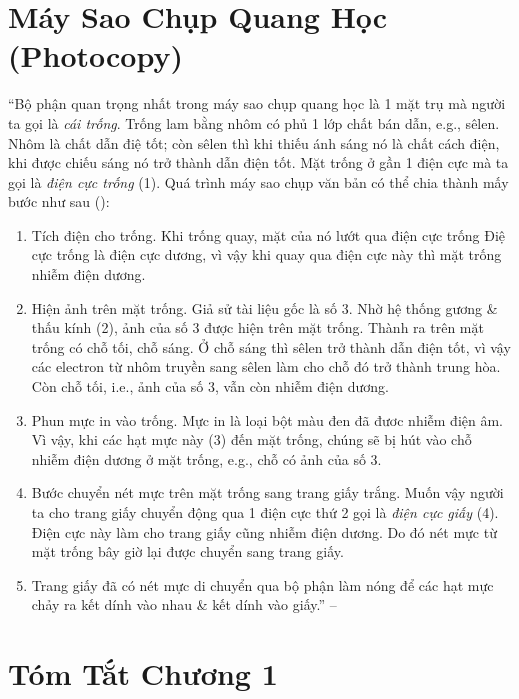 \documentclass[oneside]{book}
\numberwithin{equation}{section}
\begin{document}
\section{Máy Sao Chụp Quang Học (Photocopy)}
``Bộ phận quan trọng nhất trong máy sao chụp quang học là 1 mặt trụ mà người ta gọi là \textit{cái trống}. Trống lam bằng nhôm có phủ 1 lớp chất bán dẫn, e.g., sêlen. Nhôm là chất dẫn điệ tốt; còn sêlen thì khi thiếu ánh sáng nó là chất cách điện, khi được chiếu sáng nó trở thành dẫn điện tốt. Mặt trống ở gần 1 điện cực mà ta gọi là \textit{điện cực trống} (1). Quá trình máy sao chụp văn bản có thể chia thành mấy bước như sau (\cite[Hình 9.1, p. 44]{SGK_Vat_Ly_11_nang_cao}):
\begin{enumerate}
	\item Tích điện cho trống. Khi trống quay, mặt của nó lướt qua điện cực trống Điệ cực trống là điện cực dương, vì vậy khi quay qua điện cực này thì mặt trống nhiễm điện dương.
	\item Hiện ảnh trên mặt trống. Giả sử tài liệu gốc là số 3. Nhờ hệ thống gương \& thấu kính (2), ảnh của số 3 được hiện trên mặt trống. Thành ra trên mặt trống có chỗ tối, chỗ sáng. Ở chỗ sáng thì sêlen trở thành dẫn điện tốt, vì vậy các electron từ nhôm truyền sang sêlen làm cho chỗ đó trở thành trung hòa. Còn chỗ tối, i.e., ảnh của số 3, vẫn còn nhiễm điện dương.
	\item Phun mực in vào trống. Mực in là loại bột màu đen đã đươc nhiễm điện âm. Vì vậy, khi các hạt mực này (3) đến mặt trống, chúng sẽ bị hút vào chỗ nhiễm điện dương ở mặt trống, e.g., chỗ có ảnh của số 3.
	\item Bước chuyển nét mực trên mặt trống sang trang giấy trắng. Muốn vậy người ta cho trang giấy chuyển động qua 1 điện cực thứ 2 gọi là \textit{điện cực giấy} (4). Điện cực này làm cho trang giấy cũng nhiễm điện dương. Do đó nét mực từ mặt trống bây giờ lại được chuyển sang trang giấy.
	\item Trang giấy đã có nét mực di chuyển qua bộ phận làm nóng để các hạt mực chảy ra kết dính vào nhau \& kết dính vào giấy.'' -- \cite[p. 44]{SGK_Vat_Ly_11_nang_cao}
\end{enumerate}


\section{Tóm Tắt Chương 1}
\end{document}

